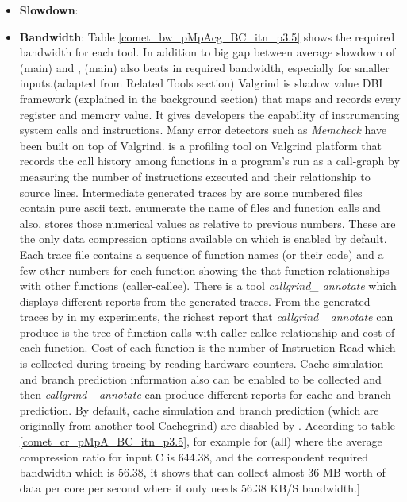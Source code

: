 \begin{itemize}
\item \textbf{Slowdown}: 
\item \textbf{Bandwidth}: Table \ref{comet_bw_pMpAcg_BC_itn_p3.5} shows the required bandwidth for each tool. In addition to big gap between average slowdown of \parlot(main) and \callgrind, \parlot(main) also beats \callgrind in required bandwidth, especially for smaller inputs.(adapted from Related Tools section) Valgrind is shadow value DBI framework (explained in the background section) that maps and records every register and memory value. It gives developers the capability of instrumenting system calls and instructions. Many error detectors such as \textit{Memcheck} have been built on top of Valgrind. \callgrind is a profiling tool  on Valgrind platform that records the call history among functions in a program's run as a call-graph by measuring the number of instructions executed and their relationship to source lines. 
Intermediate generated traces by \callgrind are some numbered files contain pure ascii text. \callgrind enumerate the name of files and function calls and also, stores those numerical values as relative to previous numbers. These are the only data compression options available on \callgrind which is enabled by default. Each \callgrind trace file contains a sequence of function names (or their code) and a few other numbers for each function showing the that function relationships with other functions (caller-callee). There is a tool \textit{callgrind\_ annotate} which displays different reports from the generated traces. From the generated traces by \callgrind in my experiments, the richest report that \textit{callgrind\_ annotate} can produce is the tree of function calls with caller-callee relationship and cost of each function. Cost of each function is the number of Instruction Read which is collected during tracing by reading hardware counters. Cache simulation and branch prediction information also can be enabled to be collected and then \textit{callgrind\_ annotate} can produce different reports for cache and branch prediction. By default, cache simulation and branch prediction (which are originally from another tool Cachegrind) are disabled by \callgrind.
According to table \ref{comet_cr_pMpA_BC_itn_p3.5}, for example for \parlot(all) where the average compression ratio for input C is 644.38, and the correspondent required bandwidth which is 56.38, it shows that \parlot can collect almost 36 MB worth of data per core per second where it only needs 56.38 KB/S bandwidth.]
\end{itemize}

